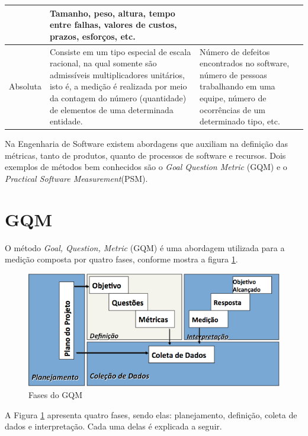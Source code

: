 \begin{longtable}{|p{70pt}|p{220pt}|p{135pt}|}
{ 	 }
 	 & {\raggedright Tamanho, peso, altura, tempo entre falhas, valores de custos, prazos, esforços, etc.} \\
 	\hline
 	{\raggedright Absoluta}
 	 & {\raggedright Consiste em um tipo especial de escala racional, na qual somente são admissíveis multiplicadores unitários, isto é, a medição é realizada por meio da contagem do número (quantidade) de elementos de uma determinada entidade.}
 	 & {\raggedright Número de defeitos encontrados no software, número de pessoas trabalhando em uma equipe, número de ocorrências de um determinado tipo, etc.} \\
 	\hline
 	
 	\end{longtable}
 
 \clearpage
 Na Engenharia de Software existem abordagens que auxiliam na definição das métricas, tanto de produtos, quanto de processos de software e recursos. Dois exemplos de métodos bem conhecidos são o \textit{Goal Question Metric} (GQM) e o \textit{Practical Software Measurement}(PSM).

\section{GQM}
\label{GQM}

O método \textit{Goal, Question, Metric} (GQM)  é uma abordagem utilizada para a medição composta por quatro fases\cite{sollingen}, conforme mostra a figura \ref{Fases_GQM}.

\begin{figure}[h]
\centering
\includegraphics[keepaspectratio=true,scale=0.7]{figuras/GQM_fases.png}
\caption{Fases do GQM \cite{sollingen}}
\label{Fases_GQM}
\end{figure}

A Figura \ref{Fases_GQM} apresenta quatro fases, sendo elas:  planejamento, definição, coleta de dados e interpretação. Cada uma delas é explicada a seguir.

